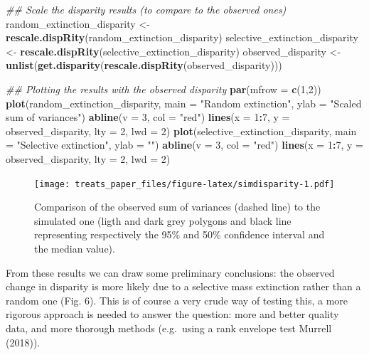 \documentclass[
]{article}
\newenvironment{Shaded}{\begin{snugshade}}{\end{snugshade}}
\newcommand{\CommentTok}[1]{\textcolor[rgb]{0.56,0.35,0.01}{\textit{#1}}}
\newcommand{\DataTypeTok}[1]{\textcolor[rgb]{0.13,0.29,0.53}{#1}}
\newcommand{\DecValTok}[1]{\textcolor[rgb]{0.00,0.00,0.81}{#1}}
\newcommand{\KeywordTok}[1]{\textcolor[rgb]{0.13,0.29,0.53}{\textbf{#1}}}
\newcommand{\NormalTok}[1]{#1}
\newcommand{\OperatorTok}[1]{\textcolor[rgb]{0.81,0.36,0.00}{\textbf{#1}}}
\newcommand{\StringTok}[1]{\textcolor[rgb]{0.31,0.60,0.02}{#1}}
\begin{document}
\begin{Shaded}
\begin{Highlighting}[]
\CommentTok{\#\# Scale the disparity results (to compare to the observed ones)}
\NormalTok{random\_extinction\_disparity \textless{}{-}}\StringTok{ }\KeywordTok{rescale.dispRity}\NormalTok{(random\_extinction\_disparity)}
\NormalTok{selective\_extinction\_disparity \textless{}{-}}\StringTok{ }\KeywordTok{rescale.dispRity}\NormalTok{(selective\_extinction\_disparity)}
\NormalTok{observed\_disparity \textless{}{-}}\StringTok{ }\KeywordTok{unlist}\NormalTok{(}\KeywordTok{get.disparity}\NormalTok{(}\KeywordTok{rescale.dispRity}\NormalTok{(observed\_disparity)))}

\CommentTok{\#\# Plotting the results with the observed disparity}
\KeywordTok{par}\NormalTok{(}\DataTypeTok{mfrow =} \KeywordTok{c}\NormalTok{(}\DecValTok{1}\NormalTok{,}\DecValTok{2}\NormalTok{))}
\KeywordTok{plot}\NormalTok{(random\_extinction\_disparity, }\DataTypeTok{main =} \StringTok{"Random extinction"}\NormalTok{, }\DataTypeTok{ylab =} \StringTok{"Scaled sum of variances"}\NormalTok{)}
\KeywordTok{abline}\NormalTok{(}\DataTypeTok{v =} \DecValTok{3}\NormalTok{, }\DataTypeTok{col =} \StringTok{"red"}\NormalTok{)}
\KeywordTok{lines}\NormalTok{(}\DataTypeTok{x =} \DecValTok{1}\OperatorTok{:}\DecValTok{7}\NormalTok{, }\DataTypeTok{y =}\NormalTok{ observed\_disparity, }\DataTypeTok{lty =} \DecValTok{2}\NormalTok{, }\DataTypeTok{lwd =} \DecValTok{2}\NormalTok{)}
\KeywordTok{plot}\NormalTok{(selective\_extinction\_disparity, }\DataTypeTok{main =} \StringTok{"Selective extinction"}\NormalTok{, }\DataTypeTok{ylab =} \StringTok{""}\NormalTok{)}
\KeywordTok{abline}\NormalTok{(}\DataTypeTok{v =} \DecValTok{3}\NormalTok{, }\DataTypeTok{col =} \StringTok{"red"}\NormalTok{)}
\KeywordTok{lines}\NormalTok{(}\DataTypeTok{x =} \DecValTok{1}\OperatorTok{:}\DecValTok{7}\NormalTok{, }\DataTypeTok{y =}\NormalTok{ observed\_disparity, }\DataTypeTok{lty =} \DecValTok{2}\NormalTok{, }\DataTypeTok{lwd =} \DecValTok{2}\NormalTok{)}
\end{Highlighting}
\end{Shaded}

\begin{figure}
\centering
\texttt{[image: treats\_paper\_files/figure-latex/simdisparity-1.pdf]}
\caption{Comparison of the observed sum of variances (dashed line) to
the simulated one (ligth and dark grey polygons and black line
representing respectively the 95\% and 50\% confidence interval and the
median value).}
\end{figure}

From these results we can draw some preliminary conclusions: the
observed change in disparity is more likely due to a selective mass
extinction rather than a random one (Fig. 6). This is of course a very
crude way of testing this, a more rigorous approach is needed to answer
the question: more and better quality data, and more thorough methods
(e.g.~using a rank envelope test Murrell (2018)).
\end{document}
